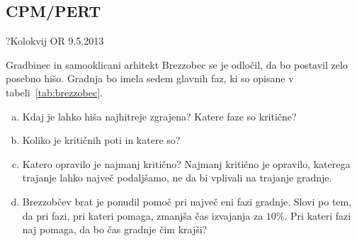 \subsection{CPM/PERT}

\begin{naloga}{?}{Kolokvij OR 9.5.2013}
\begin{vprasanje}
Gradbinec in samooklicani arhitekt Brezzobec se je odločil,
da bo postavil zelo posebno hišo.
Gradnja bo imela sedem glavnih faz,
ki so opisane v tabeli~\ref{tab:brezzobec}.
\begin{enumerate}[(a)]
\item Kdaj je lahko hiša najhitreje zgrajena?
Katere faze so kritične?
\item Koliko je kritičnih poti in katere so?
\item Katero opravilo je najmanj kritično?
Najmanj kritično je opravilo, katerega trajanje lahko največ podaljšamo,
ne da bi vplivali na trajanje gradnje.
\item Brezzobčev brat je ponudil pomoč pri največ eni fazi gradnje.
Slovi po tem, da pri fazi, pri kateri pomaga, zmanjša čas izvajanja za $10\%$.
Pri kateri fazi naj pomaga, da bo čas gradnje čim krajši?
\end{enumerate}

\begin{table}[t]
\caption{Podatki za nalogi~\ref{nal:brezzobec} in~\ref{nal:brezzobec-pert}.}
\label{tab:brezzobec}
\end{table}
\end{vprasanje}
\begin{odgovor}
\end{odgovor}
\end{naloga}


